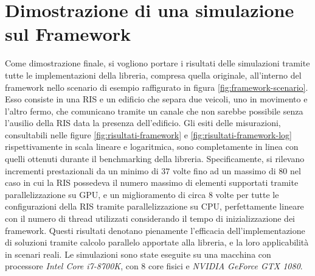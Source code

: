\section{Dimostrazione di una simulazione sul Framework}
\label{sec:dimostrazione}

Come dimostrazione finale, si vogliono portare i risultati delle simulazioni tramite
tutte le implementazioni della libreria, compresa quella originale, all'interno del
framework nello scenario di esempio raffigurato in figura \ref{fig:framework-scenario}.
Esso consiste in una RIS e un edificio che separa due veicoli, uno in movimento e
l'altro fermo, che comunicano tramite un canale che non sarebbe possibile senza
l'ausilio della RIS data la presenza dell'edificio. Gli esiti delle misurazioni,
consultabili nelle figure \ref{fig:risultati-framework} e
\ref{fig:risultati-framework-log} rispettivamente in scala lineare e logaritmica,
sono completamente in linea con quelli ottenuti durante il benchmarking della libreria.
Specificamente, si rilevano incrementi prestazionali da un minimo di $37$ volte fino
ad un massimo di $80$ nel caso in cui la RIS possedeva il numero massimo di elementi
supportati tramite parallelizzazione su GPU, e un miglioramento di circa $8$
volte per tutte le configurazioni della RIS tramite parallelizzazione su CPU, perfettamente
lineare con il numero di thread utilizzati considerando il tempo di inizializzazione
dei framework. Questi risultati denotano pienamente l'efficacia dell'implementazione
di soluzioni tramite calcolo parallelo apportate alla libreria, e la loro applicabilità
in scenari reali. Le simulazioni sono state eseguite su una macchina con
processore \textit{Intel Core i7-8700K}, con $8$ core fisici e \textit{NVIDIA
GeForce GTX 1080}.

